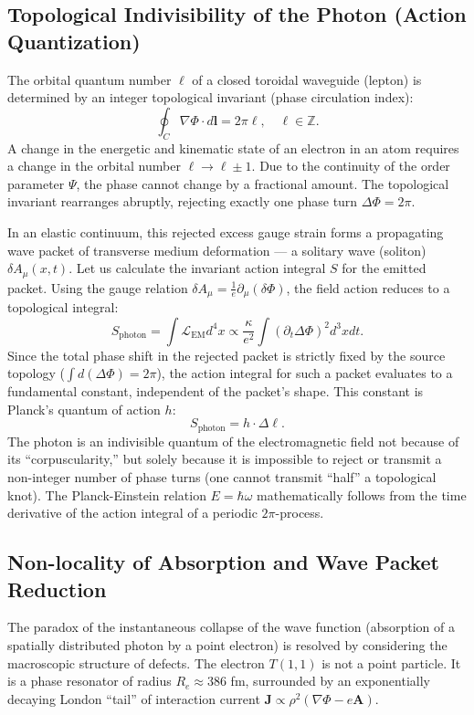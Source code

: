 \documentclass[12pt,a4paper]{article}
\begin{document}
\subsection{Topological Indivisibility of the Photon (Action Quantization)}
The orbital quantum number $\ell$ of a closed toroidal waveguide (lepton) is determined by an integer topological invariant (phase circulation index):
\begin{equation}
	\oint_{C} \nabla \Phi \cdot d\mathbf{l} = 2\pi \ell, \quad \ell \in \mathbb{Z}.
\end{equation}
A change in the energetic and kinematic state of an electron in an atom requires a change in the orbital number $\ell \to \ell \pm 1$. Due to the continuity of the order parameter $\Psi$, the phase cannot change by a fractional amount. The topological invariant rearranges abruptly, rejecting exactly one phase turn $\Delta \Phi = 2\pi$.

In an elastic continuum, this rejected excess gauge strain forms a propagating wave packet of transverse medium deformation — a solitary wave (soliton) $\delta A_\mu(x,t)$. 
Let us calculate the invariant action integral $S$ for the emitted packet. Using the gauge relation $\delta A_\mu = \frac{1}{e} \partial_\mu (\delta \Phi)$, the field action reduces to a topological integral:
\begin{equation}
	S_{\text{photon}} = \int \mathcal{L}_{\text{EM}} d^4x \propto \frac{\kappa}{e^2} \int (\partial_t \Delta \Phi)^2 d^3x dt.
\end{equation}
Since the total phase shift in the rejected packet is strictly fixed by the source topology ($\int d(\Delta \Phi) = 2\pi$), the action integral for such a packet evaluates to a fundamental constant, independent of the packet's shape. This constant is Planck's quantum of action $h$:
\begin{equation}
	S_{\text{photon}} = h \cdot \Delta \ell.
\end{equation}
The photon is an indivisible quantum of the electromagnetic field not because of its ``corpuscularity,'' but solely because it is impossible to reject or transmit a non-integer number of phase turns (one cannot transmit ``half'' a topological knot). The Planck-Einstein relation $E = \hbar \omega$ mathematically follows from the time derivative of the action integral of a periodic $2\pi$-process.

\subsection{Non-locality of Absorption and Wave Packet Reduction}
The paradox of the instantaneous collapse of the wave function (absorption of a spatially distributed photon by a point electron) is resolved by considering the macroscopic structure of defects.
The electron $T(1,1)$ is not a point particle. It is a phase resonator of radius $R_e \approx 386$ fm, surrounded by an exponentially decaying London ``tail'' of interaction current $\mathbf{J} \propto \rho^2 (\nabla \Phi - e \mathbf{A})$.
\end{document}
